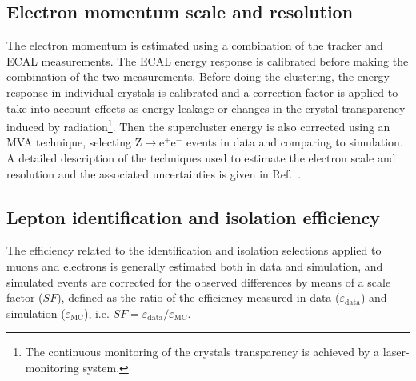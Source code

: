 \subsection{Electron momentum scale and resolution}
The electron momentum is estimated using a combination of the tracker and ECAL measurements. The ECAL energy response is calibrated before making the combination of the two measurements. Before doing the clustering, the energy response in individual crystals is calibrated and a correction factor is applied to take into account effects as energy leakage or changes in the crystal transparency induced by radiation\footnote{The continuous monitoring of the crystals transparency is achieved by a laser-monitoring system.}. Then the supercluster energy is also corrected using an MVA technique, selecting $\mathrm{Z\to e^+ e^-}$ events in data and comparing to simulation. A detailed description of the techniques used to estimate the electron scale and resolution and the associated uncertainties is given in Ref.~\cite{Khachatryan:2015hwa}.



\subsection{Lepton identification and isolation efficiency}\label{sec:lepIdIsoEff}
The efficiency related to the identification and isolation selections applied to muons and electrons is generally estimated both in data and simulation, and simulated events are corrected for the observed differences by means of a scale factor ($SF$), defined as the ratio of the efficiency measured in data ($\varepsilon_\mathrm{data}$) and simulation ($\varepsilon_\mathrm{MC}$), i.e. $SF = \varepsilon_\mathrm{data}/\varepsilon_\mathrm{MC}$.

